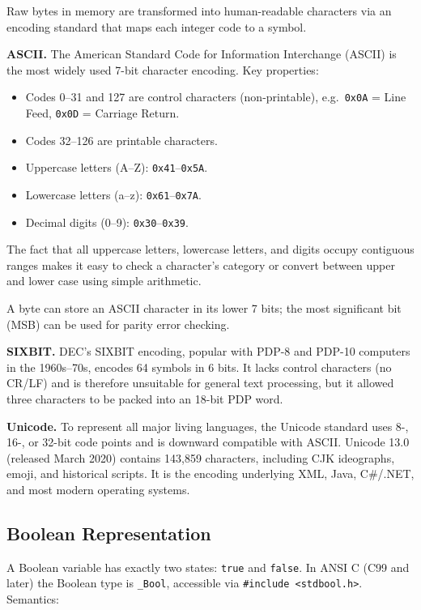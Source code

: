\documentclass[11pt, a4paper, notitlepage]{report}
\theoremstyle{definition}
\theoremstyle{remark}
\theoremstyle{definition}
\begin{document}
Raw bytes in memory are transformed into human-readable characters via an encoding standard that maps each integer code to a symbol.

\textbf{ASCII.} The American Standard Code for Information Interchange (ASCII) is the most widely used 7-bit character encoding. Key properties:

\begin{itemize}
  \item Codes 0--31 and 127 are control characters (non-printable), e.g.\ \texttt{0x0A} = Line Feed, \texttt{0x0D} = Carriage Return.
  \item Codes 32--126 are printable characters.
  \item Uppercase letters (A--Z): \texttt{0x41}--\texttt{0x5A}.
  \item Lowercase letters (a--z): \texttt{0x61}--\texttt{0x7A}.
  \item Decimal digits (0--9): \texttt{0x30}--\texttt{0x39}.
\end{itemize}

The fact that all uppercase letters, lowercase letters, and digits occupy contiguous ranges makes it easy to check a character's category or convert between upper and lower case using simple arithmetic.

A byte can store an ASCII character in its lower 7 bits; the most significant bit (MSB) can be used for parity error checking.

\textbf{SIXBIT.} DEC's SIXBIT encoding, popular with PDP-8 and PDP-10 computers in the 1960s--70s, encodes 64 symbols in 6 bits. It lacks control characters (no CR/LF) and is therefore unsuitable for general text processing, but it allowed three characters to be packed into an 18-bit PDP word.

\textbf{Unicode.} To represent all major living languages, the Unicode standard uses 8-, 16-, or 32-bit code points and is downward compatible with ASCII\@. Unicode 13.0 (released March 2020) contains 143,859 characters, including CJK ideographs, emoji, and historical scripts. It is the encoding underlying XML, Java, C\#/.NET, and most modern operating systems.

\subsection{Boolean Representation}

A Boolean variable has exactly two states: \texttt{true} and \texttt{false}. In ANSI C (C99 and later) the Boolean type is \texttt{\_Bool}, accessible via \texttt{\#include <stdbool.h>}. Semantics:
\end{document}
